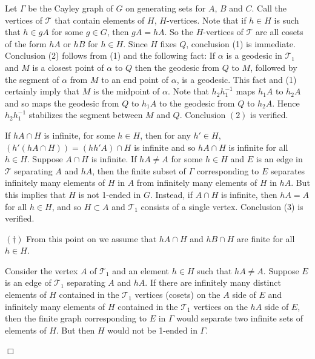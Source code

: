 \documentclass[12pt]{article}
\newenvironment{proof}{\addvspace{12pt}\noindent{\bf Proof:}}{
$\Box$\par\addvspace{12pt}}
\begin{document}
\begin{proof}
Let $\Gamma$ be the Cayley graph of $G$ on generating sets for $A$, $B$ and $C$.
Call the vertices of $\mathcal T$ that contain elements of $H$, $H$-vertices. Note that if $h\in H$ is such that $h\in gA$ for some $g\in G$, then $gA=hA$. So the $H$-vertices of $\mathcal T$ are all cosets of the form $hA$ or $hB$ for $h\in H$. 
Since $H$ fixes $Q$, conclusion (1) is immediate. Conclusion (2) follows from (1) and the following fact: If $\alpha$ is a geodesic in $\mathcal T_1$ and $M$ is a closest point of $\alpha$ to $Q$ then the geodesic from $Q$ to $M$, followed by the segment of $\alpha$ from $M$ to an end point of $\alpha$, is a geodesic. This fact and (1) certainly imply that $M$ is the midpoint of $\alpha$. Note that $h_2h_1^{-1}$ maps $h_1A$ to $h_2A$ and so maps the geodesic from $Q$ to $h_1A$ to the geodesic from $Q$ to $h_2A$. Hence $h_2h_1^{-1}$ stabilizes the segment between $M$ and $Q$. Conclusion $(2)$ is verified. 

If $hA\cap H$ is infinite, for some $h\in H$, then for any $h'\in H$, $(h'(hA\cap H))=(hh'A)\cap H$ is infinite and so $hA\cap H$ is infinite for all $h\in H$. Suppose $A\cap H$ is infinite. If $hA\ne A$ for some $h\in H$ and $E$ is an edge in $\mathcal T$ separating $A$ and $hA$, then the finite subset of $\Gamma$ corresponding to $E$ separates infinitely many elements of $H$ in $A$ from infinitely many elements of $H$ in $hA$. But this implies that $H$ is not 1-ended in $G$. Instead, if $A\cap H$ is infinite, then $hA=A$ for all $h\in H$, and so $H\subset A$ and $\mathcal T_1$ consists of a single vertex. Conclusion (3) is verified. 

\medskip

$(\dagger)$ From this point on we assume that $hA\cap H$ and $hB\cap H$ are finite for all $h\in H$. 

\medskip 

Consider the vertex $A$ of $\mathcal T_1$ and an element $h\in H$ such that $hA\ne A$. %
Suppose $E$ is an edge of $\mathcal T_1$ separating $A$ and $hA$. If there are infinitely many distinct elements of $H$ contained in the $\mathcal T_1$ vertices (cosets) on the $A$ side of $E$ and infinitely many elements of $H$ contained in the $\mathcal T_1$ vertices on the $hA$ side of $E$, then the finite graph corresponding to $E$ in $\Gamma$ would separate two infinite sets of elements of $H$. But then $H$ would not be 1-ended in $\Gamma$. 


\end{proof}
\end{document}
